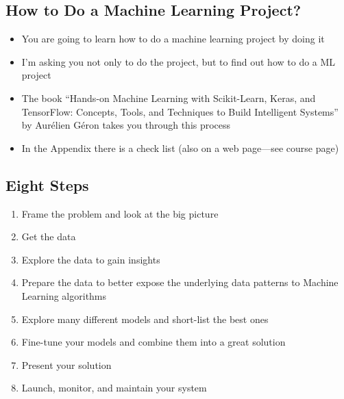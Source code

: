 \Outline %

\begin{slide}
\section{How to Do a Machine Learning Project?}

\begin{PauseHighLight}
  \begin{itemize}
  \item You are going to learn how to do a machine learning project by
    doing it\pause
  \item I'm asking you not only to do the project, but to find out how
    to do a ML project\pause
  \item The book ``Hands-on Machine Learning with Scikit-Learn, Keras,
    and TensorFlow: Concepts, Tools, and Techniques to Build
    Intelligent Systems'' by Aur\'elien G\'eron takes you through this
    process\pause
  \item In the Appendix there is a check list (also on a web
    page---see course page)\pause
  \end{itemize}
\end{PauseHighLight}

\end{slide}


\begin{slide}
\section[-1]{Eight Steps}
\begin{PauseHighLight}
  \begin{enumerate}\squeeze
  \item Frame the problem and look at the big picture\pause
  \item Get the data\pause
  \item Explore the data to gain insights\pause
  \item Prepare the data to better expose the underlying data patterns
    to Machine Learning algorithms\pause
  \item Explore many different models and short-list the best ones\pause
  \item Fine-tune your models and combine them into a great solution\pause
  \item Present your solution\pause
  \item Launch, monitor, and maintain your system\pause
  \end{enumerate}
\end{PauseHighLight}
\end{slide}

